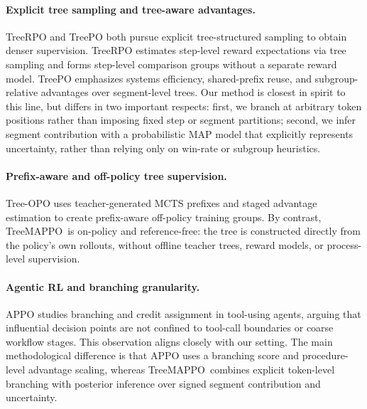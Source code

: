 \documentclass{article}
\newcommand{\ours}{TreeMAPPO}
\begin{document}
\paragraph{Explicit tree sampling and tree-aware advantages.}
TreeRPO \cite{treerpo2025} and TreePO \cite{treepo2025} both pursue explicit tree-structured sampling to obtain denser supervision. TreeRPO estimates step-level reward expectations via tree sampling and forms step-level comparison groups without a separate reward model. TreePO emphasizes systems efficiency, shared-prefix reuse, and subgroup-relative advantages over segment-level trees. Our method is closest in spirit to this line, but differs in two important respects: first, we branch at arbitrary token positions rather than imposing fixed step or segment partitions; second, we infer segment contribution with a probabilistic MAP model that explicitly represents uncertainty, rather than relying only on win-rate or subgroup heuristics.

\paragraph{Prefix-aware and off-policy tree supervision.}
Tree-OPO \cite{treeopo2025} uses teacher-generated MCTS prefixes and staged advantage estimation to create prefix-aware off-policy training groups. By contrast, \ours\ is on-policy and reference-free: the tree is constructed directly from the policy's own rollouts, without offline teacher trees, reward models, or process-level supervision.

\paragraph{Agentic RL and branching granularity.}
APPO \cite{appo2026} studies branching and credit assignment in tool-using agents, arguing that influential decision points are not confined to tool-call boundaries or coarse workflow stages. This observation aligns closely with our setting. The main methodological difference is that APPO uses a branching score and procedure-level advantage scaling, whereas \ours\ combines explicit token-level branching with posterior inference over signed segment contribution and uncertainty.
\end{document}
